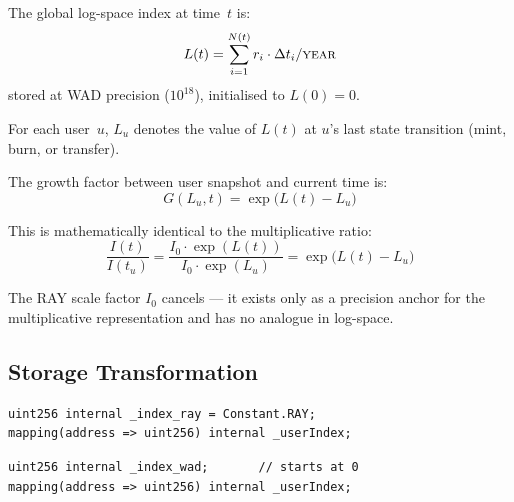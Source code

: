 \documentclass[10pt,a4paper,twocolumn]{article}
\begin{document}
\begin{definition}
\label{def:log-index}
The global log-space index at time~$t$ is:
\begin{equation}
\label{eq:log-index}
L(t) = \sum_{i=1}^{N(t)} r_i \cdot \Delta t_i / \textsc{year}
\end{equation}
stored at WAD precision ($10^{18}$), initialised to $L(0) = 0$.
\end{definition}

\begin{definition}
\label{def:user-snapshot}
For each user~$u$, $L_u$ denotes the value of $L(t)$ at $u$'s last state transition (mint, burn, or transfer).
\end{definition}

\begin{definition}
\label{def:growth}
The growth factor between user snapshot and current time is:
\begin{equation}
\label{eq:growth-factor}
G(L_u, t) = \exp\bigl(L(t) - L_u\bigr)
\end{equation}
\end{definition}

This is mathematically identical to the multiplicative ratio:
\begin{equation}
\label{eq:equivalence}
\frac{I(t)}{I(t_u)} = \frac{I_0 \cdot \exp(L(t))}{I_0 \cdot \exp(L_u)} = \exp\bigl(L(t) - L_u\bigr)
\end{equation}

The RAY scale factor $I_0$ cancels --- it exists only as a precision anchor for the multiplicative representation and has no analogue in log-space.

\subsection{Storage Transformation}
\label{subsec:storage}

\begin{lstlisting}[language=Solidity, caption={Multiplicative RAY index (before)}, label={lst:ray-storage}]
uint256 internal _index_ray = Constant.RAY;
mapping(address => uint256) internal _userIndex;
\end{lstlisting}

\begin{lstlisting}[language=Solidity, caption={Log-space WAD index (after)}, label={lst:log-storage}]
uint256 internal _index_wad;       // starts at 0
mapping(address => uint256) internal _userIndex;
\end{lstlisting}
\end{document}
